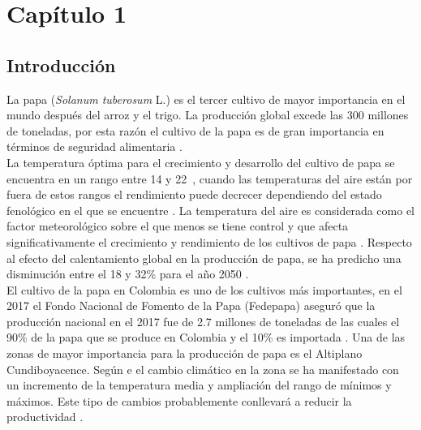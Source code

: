 
\chapter{Capítulo 1}
\section{Introducción}

La papa (\textit{Solanum tuberosum} L.) es el tercer cultivo de mayor importancia en el mundo después del arroz y el trigo. La producción global excede las 300 millones de toneladas, por esta razón el cultivo de la papa es de gran importancia en términos de seguridad alimentaria \citep{birch2012crops}.\\

La temperatura óptima para el crecimiento y desarrollo del cultivo de papa se encuentra en un rango entre 14 y 22\celc \ , cuando las temperaturas del aire están por fuera de estos rangos el rendimiento puede decrecer dependiendo del estado fenológico en el que se encuentre \citep{Hijmans2003}. La temperatura del aire es considerada como el factor meteorológico sobre el que menos se tiene control y que afecta significativamente el crecimiento y rendimiento de los cultivos de papa \citep{hancock2014physiological}. Respecto al efecto del calentamiento global en la producción de papa, se ha predicho una disminución entre el 18 y 32\% para el año 2050 \citep{hijmans2003effect}. \\

El cultivo de la papa en Colombia es uno de los cultivos más importantes, en el 2017 el Fondo Nacional de Fomento de la Papa (Fedepapa) aseguró que la producción nacional en el 2017 fue de 2.7 millones de toneladas de las  cuales el 90\% de la papa que se produce en Colombia y el 10\% es importada \citep{Portafolio2017}. Una de las zonas de mayor importancia para la producción de papa es el Altiplano Cundiboyacence. Según \citet{Barrientos2014} e \citet{IDEAM2009} el cambio climático en la zona se ha manifestado con un incremento de la temperatura media y ampliación del rango de mínimos y máximos. Este tipo de cambios probablemente conllevará a reducir la productividad \citep{Hatfield2015}.\\

